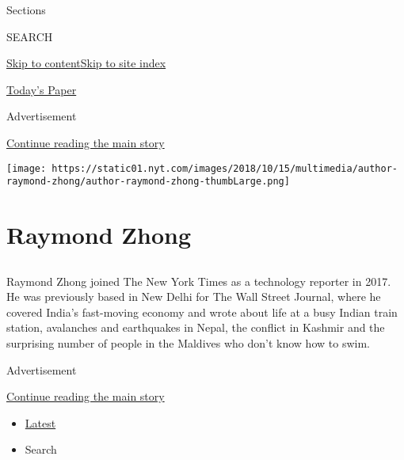 Sections

SEARCH

\protect\hyperlink{site-content}{Skip to
content}\protect\hyperlink{site-index}{Skip to site index}

\href{https://myaccount.nytimes.com/auth/login?response_type=cookie\&client_id=vi}{}

\href{https://www.nytimes.com/section/todayspaper}{Today's Paper}

Advertisement

\protect\hyperlink{after-top}{Continue reading the main story}

\texttt{[image: https://static01.nyt.com/images/2018/10/15/multimedia/author-raymond-zhong/author-raymond-zhong-thumbLarge.png]}

\hypertarget{raymond-zhong}{%
\section{Raymond Zhong}\label{raymond-zhong}}

\subsection{}

Raymond Zhong joined The New York Times as a technology reporter in
2017. He was previously based in New Delhi for The Wall Street Journal,
where he covered India's fast-moving economy and wrote about life at a
busy Indian train station, avalanches and earthquakes in Nepal, the
conflict in Kashmir and the surprising number of people in the Maldives
who don't know how to swim.~

Advertisement

\protect\hyperlink{after-mid1}{Continue reading the main story}

\begin{itemize}
\tightlist
\item
  \protect\hyperlink{stream-panel}{Latest}
\item
  Search
\end{itemize}

